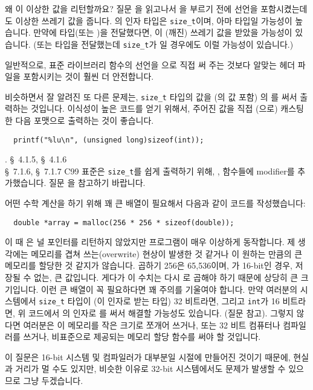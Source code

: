 \begin{faq}
        왜 이 이상한 값을 리턴할까요? 질문 을 읽고나서
        을 부르기 전에  선언을
        포함시켰는데도 이상한 쓰레기 값을 줍니다.
\A
        의 인자 타입은 \verb+size_t+이며, 아마 
        타입일 가능성이 높습니다. 만약에  
        타입(또는 )을
        전달했다면, 이 (깨진) 쓰레기 값을 받았을 가능성이 있습니다.
        (또는  타입을 전달했는데 \verb+size_t+가 일 경우에도
        이럴 가능성이 있습니다.)

        일반적으로, 표준 라이브러리 함수의 선언을 으로 직접 써 주는
        것보다 알맞는 헤더 파일을 포함시키는 것이 훨씬 더 안전합니다.

        비슷하면서 잘 알려진 또 다른 문제는, \verb+size_t+ 타입의 값을
        (의 값 포함) 의 를 써서 출력하는
        것입니다. 이식성이 높은 코드를 얻기 위해서, 주어진 값을 직접
        (으로) 캐스팅한 다음  포맷으로 출력하는 것이
        좋습니다.
\begin{verbatim}
  printf("%lu\n", (unsigned long)sizeof(int));
\end{verbatim}
        .
\R
        \cite{ansi} \S\ 4.1.5, \S\ 4.1.6 \\
        \cite{c89} \S\ 7.1.6, \S\ 7.1.7
\T
	C99 표준은 \verb+size_t+를 쉽게 출력하기 위해, ,
         함수들에  modifier를 추가했습니다.
        질문 을 참고하기 바랍니다.
\end{faq}
        
\begin{faq}
	어떤 수학 계산을 하기 위해 꽤 큰 배열이 필요해서 다음과
	같이 코드를 작성했습니다:
\begin{verbatim}
  double *array = malloc(256 * 256 * sizeof(double));
\end{verbatim}
	\noindent 이 때 은 널 포인터를 리턴하지 않았지만
	프로그램이 매우 이상하게 동작합니다.  제 생각에는 메모리를 겹쳐
	쓰는(overwrite) 현상이 발생한 것 같거나 이 원하는 만큼의
	큰 메모리를 할당한 것 같지가 않습니다.
 곱하기 256은 65,536이며, 가 16-bit인 경우, 저장될 수 없는,
        큰 값입니다. 게다가 이 수치는
	다시 로 곱해야 하기 때문에 상당히 큰 크기입니다.
	이런 큰 배열이 꼭 필요하다면 꽤 주의를 기울여야 합니다.
	만약 여러분의 시스템에서 \verb+size_t+ 타입이 (이 인자로 받는
	타입) 32 비트라면, 그리고 \verb+int+가 16 비트라면,
        위 코드에서 의 인자로 를
        써서 해결할 가능성도 있습니다. (질문  참고).
	그렇지 않다면 여러분은 이 메모리를 작은 크기로 쪼개어 쓰거나,
	또는 32 비트 컴퓨터나 컴파일러를 쓰거나, 비표준으로 제공되는
	메모리 할당 함수를 써야 할 것입니다.  

\T
	이 질문은 16-bit 시스템 및 컴파일러가 대부분일 시절에 만들어진 것이기
        때문에, 현실과 거리가 멀 수도 있지만, 비슷한 이유로 32-bit 시스템에서도
        문제가 발생할 수 있으므로 그냥 두겠습니다.
\end{faq}

